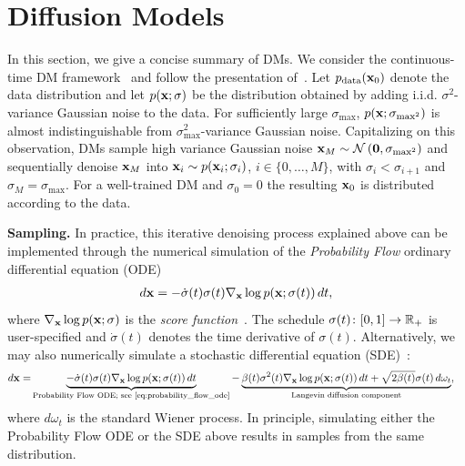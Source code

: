\documentclass{article}
\begin{document}
\newpage 
\section{Diffusion Models}
%
In this section, we give a concise summary of DMs. We consider the continuous-time DM framework~\cite{song2020score} and follow the presentation of~\citet{karras2022elucidating}. 
Let $p_{\rm{data}}({\mathbf{x}}_0)$ denote the data distribution and let $p({\mathbf{x}}; \sigma)$ be the distribution obtained by adding i.i.d. $\sigma^2$-variance Gaussian noise to the data.
For sufficiently large $\sigma_{\mathrm{max}}$, $p({\mathbf{x}}; \sigma_{\mathrm{max}^2})$ is almost indistinguishable from $\sigma^2_{\mathrm{max}}$-variance Gaussian noise. Capitalizing on this observation, DMs sample high variance Gaussian noise ${\mathbf{x}}_M \sim{\mathcal{N}}\left(\bm{0}, \sigma_{\mathrm{max}^2}\right)$ and sequentially denoise ${\mathbf{x}}_M$ into ${\mathbf{x}}_i\sim p({\mathbf{x}}_i; \sigma_i)$, $i \in \{0,\dots,M\}$, with $\sigma_{i} < \sigma_{i+1}$ and $\sigma_M=\sigma_{\mathrm{max}}$. For a well-trained DM and $\sigma_0=0$ the resulting ${\mathbf{x}}_0$ is distributed according to the data. 

\textbf{Sampling.} In practice, this iterative denoising process explained above can be implemented through the numerical simulation of the \emph{Probability Flow} ordinary differential equation (ODE)~\cite{song2020score}
%
\begin{align} \label{eq:probability_flow_ode}
    d{\mathbf{x}} = -\dot \sigma(t) \sigma(t) \nabla_{\mathbf{x}} \log p({\mathbf{x}}; \sigma(t)) \, dt,
\end{align}
%
where $\nabla_{\mathbf{x}} \log p({\mathbf{x}}; \sigma)$ is the \emph{score function}~\cite{hyvarinen2005estimation}. 
The schedule $\sigma(t) \colon [0, 1] \to \mathbb{R}_+$ is user-specified and  $\dot \sigma(t)$ denotes the time derivative of $\sigma(t)$. 
Alternatively, we may also numerically simulate a stochastic differential equation (SDE)~\citep{song2020score,karras2022elucidating}:
%
\begin{align} \label{eq:diffusion_sde}
    d\rvx = &\underbrace{- \dot \sigma(t) \sigma(t) \nabla_\rvx \log p(\rvx; \sigma(t)) \, dt}_{\text{Probability Flow ODE; see~\Cref{eq:probability_flow_ode}}} - \underbrace{\beta(t) \sigma^2(t) \nabla_\rvx \log p(\rvx; \sigma(t)) \, dt + \sqrt{2 \beta(t)} \sigma(t)\, d\omega_t}_{\text{Langevin diffusion component}},
    \end{align}
%
where $d\omega_t$ is the standard Wiener process. 
In principle, simulating either the Probability Flow ODE or the SDE above results in samples from the same distribution. 
\end{document}
